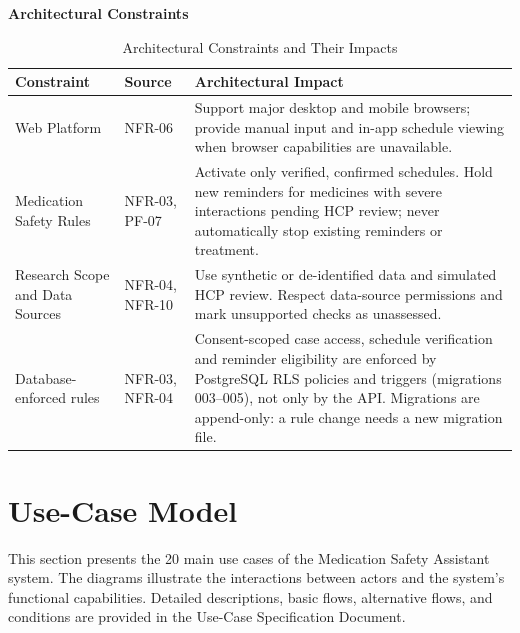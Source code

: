 \documentclass[10pt,letterpaper]{article}
\newcommand{\upd}[1]{{\color{pafourblue}#1}}
\begin{document}
\medskip
\noindent\textbf{Architectural Constraints}

\begin{table}[!htbp]
\centering
\caption{Architectural Constraints and Their Impacts}
\label{tab:architectural-constraints}

\begin{tabularx}{\textwidth}{|L{3cm}|L{2cm}|Y|}
\hline
\textbf{Constraint} & \textbf{Source} &
\textbf{Architectural Impact} \\ \hline

Web Platform & NFR-06 &
Support major desktop and mobile browsers;
provide manual input and in-app schedule viewing
when browser capabilities are unavailable.
\\ \hline

Medication Safety Rules & NFR-03, PF-07 &
Activate only verified, confirmed schedules.
Hold new reminders for medicines with severe
interactions pending HCP review; never
automatically stop existing reminders or treatment.
\\ \hline

Research Scope and Data Sources & NFR-04, NFR-10 &
Use synthetic or de-identified data and simulated HCP
review. Respect data-source permissions and
mark unsupported checks as unassessed.
\\ \hline

\upd{Database-enforced rules} & \upd{NFR-03, NFR-04} &
\upd{Consent-scoped case access, schedule verification and reminder
eligibility are enforced by PostgreSQL RLS policies and triggers
(migrations 003--005), not only by the API. Migrations are append-only:
a rule change needs a new migration file.}
\\ \hline

\end{tabularx}
\end{table}

\clearpage


\section{Use-Case Model}
\label{sec:use-case-model}

This section presents the 20 main use cases of the
Medication Safety Assistant system. The diagrams illustrate
the interactions between actors and the system's functional
capabilities. Detailed descriptions, basic flows, alternative
flows, and conditions are provided in the
Use-Case Specification Document.
\end{document}
